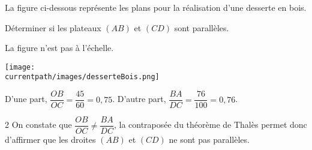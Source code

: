 \begin{exercice*}
    La figure ci-dessous représente les plans pour la réalisation d'une desserte en bois.

    Déterminer si les plateaux $(AB)$ et $(CD)$ sont parallèles.

    \begin{minipage}{1\linewidth}
    \begin{center}
        La figure n'est pas à l'échelle.

        \texttt{[image: \\currentpath/images/desserteBois.png]}    
    \end{center}
    \end{minipage}
\end{exercice*}
\begin{corrige}

    D'une part, $\dfrac{OB}{OC}=\dfrac{45}{60}=0,75$. \hspace*{10mm} D'autre part, $\dfrac{BA}{DC}=\dfrac{76}{100}=0,76$.

    \begin{spacing}2
    On constate que $\dfrac{OB}{OC}\neq\dfrac{BA}{DC}$, la contraposée du théorème de Thalès permet donc d'affirmer que les droites $(AB)$ et $(CD)$ ne sont pas parallèles.
    \end{spacing}
    
\end{corrige}

